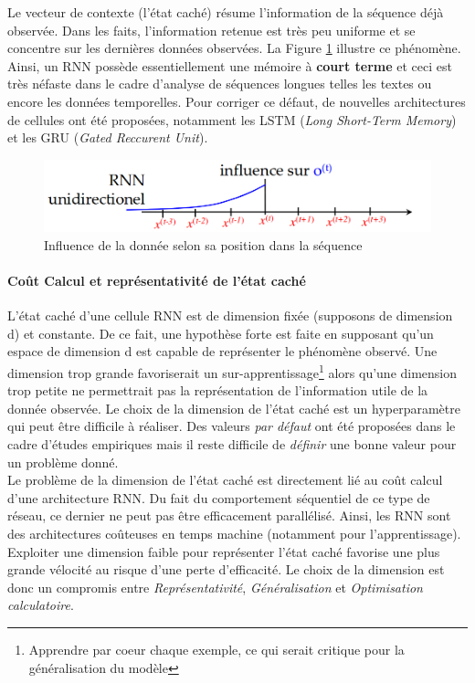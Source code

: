 \noindent Le vecteur de contexte (l'état caché) résume l'information de la séquence déjà observée. Dans les faits, l'information retenue est très peu uniforme et se concentre sur les dernières données observées. La Figure \ref{rnn_vanishing} illustre ce phénomène. Ainsi, un RNN possède essentiellement une mémoire à \textbf{court terme} et ceci est très néfaste dans le cadre d'analyse de séquences longues telles les textes ou encore les données temporelles. Pour corriger ce défaut, de nouvelles architectures de cellules ont été proposées, notamment les LSTM (\textit{Long Short-Term Memory}) et les GRU (\textit{Gated Reccurent Unit}).

\begin{figure}
    \centering
    \includegraphics[scale=0.3]{./tex/recurrent-neural-network/rnn_vanish.png}
    \caption{Influence de la donnée selon sa position dans la séquence}
    \label{rnn_vanishing}
\end{figure}

\paragraph{Coût Calcul et représentativité de l'état caché}

\noindent L'état caché d'une cellule RNN est de dimension fixée (supposons de dimension d) et constante. De ce fait, une hypothèse forte est faite en supposant qu'un espace de dimension d est capable de représenter le phénomène observé. Une dimension trop grande favoriserait un sur-apprentissage\footnote{Apprendre par coeur chaque exemple, ce qui serait critique pour la généralisation du modèle} alors qu'une dimension trop petite ne permettrait pas la représentation de l'information utile de la donnée observée. Le choix de la dimension de l'état caché est un hyperparamètre qui peut être difficile à réaliser. Des valeurs \textit{par défaut} ont été proposées dans le cadre d'études empiriques mais il reste difficile de \textit{définir} une bonne valeur pour un problème donné. \\

\noindent Le problème de la dimension de l'état caché est directement lié au coût calcul d'une architecture RNN. Du fait du comportement séquentiel de ce type de réseau, ce dernier ne peut pas être efficacement parallélisé. Ainsi, les RNN sont des architectures coûteuses en temps machine (notamment pour l'apprentissage). Exploiter une dimension faible pour représenter l'état caché favorise une plus grande vélocité au risque d'une perte d'efficacité. Le choix de la dimension est donc un compromis entre \textit{Représentativité}, \textit{Généralisation} et \textit{Optimisation calculatoire}.


